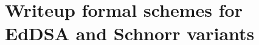 \section{Writeup formal schemes for EdDSA and Schnorr variants}
%
%
%
%
%
%
%
%
%
%
%
%
%
%
%
%
%
%
%
%
%
%
%
%

